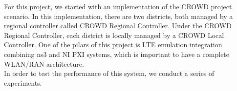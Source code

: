 For this project, we started with an implementation of the CROWD project scenario. In this implementation, there are two districts, both managed by a regional controller called CROWD Regional Controller. Under the CROWD Regional Controller, each district is locally managed by a CROWD Local Controller. One of the pilars of this project is LTE emulation integration combining ns3 and NI PXI systems, which is important to have a complete WLAN/RAN architecture.\\

In order to test the performance of this system, we conduct a series of experiments.














